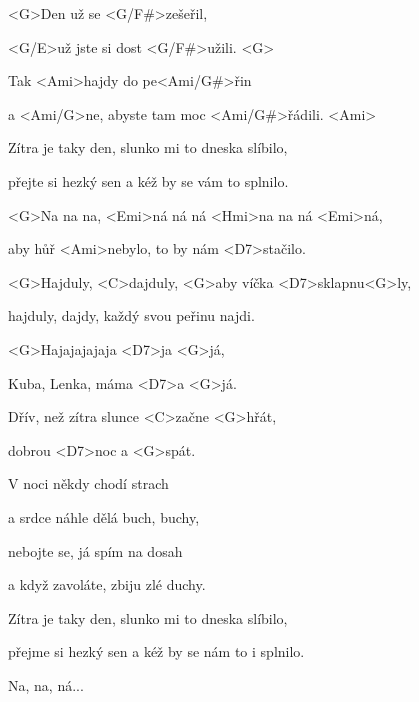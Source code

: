 

\zs
<G>Den už se <G/F#>zešeřil,

<G/E>už jste si dost <G/F#>užili. <G>

Tak <Ami>hajdy do pe<Ami/G#>řin

a <Ami/G>ne, abyste tam moc <Ami/G#>řádili. <Ami>

Zítra je taky den, slunko mi to dneska slíbilo,

přejte si hezký sen a kéž by se vám to splnilo.

<G>Na na na, <Emi>ná ná ná <Hmi>na na ná <Emi>ná,

aby hůř <Ami>nebylo, to by nám <D7>stačilo.
\ks

\zr
<G>Hajduly, <C>dajduly, <G>aby víčka 
<D7>sklapnu<G>ly, 

hajduly, dajdy, každý svou peřinu najdi.

<G>Hajajajajaja <D7>ja <G>já,

Kuba, Lenka, máma <D7>a <G>já.

Dřív, než zítra slunce <C>začne <G>hřát,

dobrou <D7>noc a <G>spát.
\kr

\zs
V noci někdy chodí strach

a srdce náhle dělá buch, buchy,

nebojte se, já spím na dosah

a když zavoláte, zbiju zlé duchy.

Zítra je taky den, slunko mi to dneska slíbilo,

přejme si hezký sen a kéž by se nám to i splnilo.

Na, na, ná...
\ks

\zr\kr

\kp
